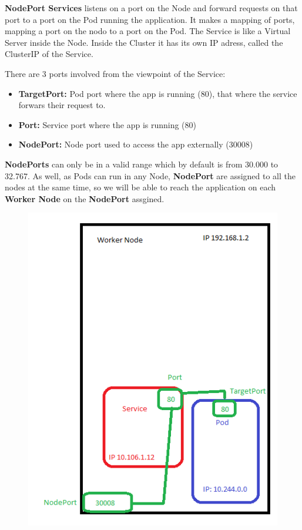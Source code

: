 \documentclass{article}
\newenvironment{blocktemplateIII}[1]{%
    \tcolorbox[beamer,%
    noparskip,breakable,
    ,colframe=Red,%
    colbacklower=LimeGreen!75!LightGreen,%
    title=#1]}%
    {\endtcolorbox}
\begin{document}
\textbf{NodePort Services} listens on a port on the Node and forward requests on that port to a port on the Pod running the application. It makes a mapping of ports, mapping a port on the nodo to a port on the Pod. The Service is like a Virtual Server inside the Node. Inside the Cluster it has its own IP adress, called the ClusterIP of the Service.

There are 3 ports involved from the viewpoint of the Service:
\begin{itemize}
    \item \textbf{TargetPort:} Pod port where the app is running (80), that where the service forwars their request to.
    \item \textbf{Port:} Service port where the app is running (80)
    \item \textbf{NodePort:} Node port used to access the app externally (30008)
\end{itemize}

\begin{blocktemplateIII}{WARNING}
\textbf{NodePorts} can only be in a valid range which by default is from 30.000 to 32.767. As well, as Pods can run in any Node, \textbf{NodePort} are assigned to all the nodes at the same time, so we will be able to reach the application on each \textbf{Worker Node} on the \textbf{NodePort} assgined.
\end{blocktemplateIII}

\begin{figure}[H]
    \centering
    \includegraphics[scale=0.5]{pictures/services3.png}
\end{figure}
\end{document}
